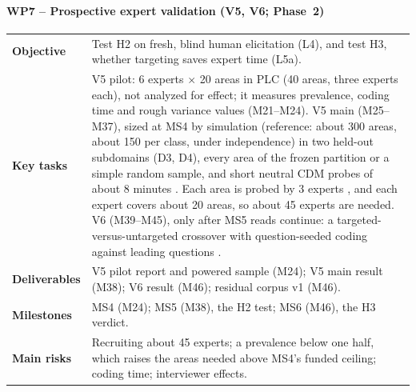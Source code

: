 \paragraph{WP7 -- Prospective expert validation (V5, V6; Phase~2)}
\mbox{}\par
\begin{tabularx}{\linewidth}{@{}>{\bfseries}p{2.6cm}X@{}}
  \toprule
  Objective & Test H2 on fresh, blind human elicitation (L4), and test H3, whether targeting
    saves expert time (L5a). \\
  Key tasks & V5 pilot: 6 experts
    $\times$ 20 areas in PLC (40 areas, three experts each), not analyzed for effect; it measures
    prevalence, coding time and rough variance values (M21--M24). V5 main (M25--M37), sized at MS4 by
    simulation (reference: about 300 areas, about 150 per class, under independence) in two held-out
    subdomains (D3, D4), every area of the frozen partition or a simple random sample, and short neutral
    CDM probes of about 8 minutes
    \evlit{} \parencite{klein1989critical}. Each area is probed by 3 experts
    \evlit{} \parencite{chao1994percentage}, and each expert covers about 20 areas, so about 45
    experts are needed. V6 (M39--M45), only after MS5 reads continue: a
    targeted-versus-untargeted crossover with question-seeded coding against leading questions
    \evlit{} \parencite{loftus1975leading}. \\
  Deliverables & V5 pilot report and powered sample (M24); V5 main result
    (M38); V6 result (M46); residual corpus v1 (M46). \\
  Milestones & MS4 (M24); MS5 (M38), the H2 test; MS6 (M46), the H3 verdict. \\
  Main risks & Recruiting about 45 experts; a prevalence below one half, which raises the areas
    needed above MS4's funded ceiling; coding time; interviewer effects. \\
  \bottomrule
\end{tabularx}

